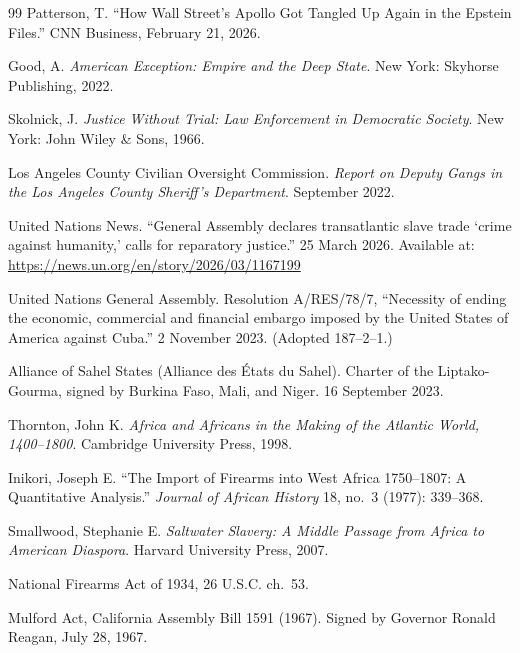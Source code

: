 \documentclass[12pt,openany]{book}
\begin{document}
\begin{thebibliography}{99}
Patterson, T. ``How Wall Street's Apollo Got Tangled Up Again in the Epstein Files.'' CNN Business, February 21, 2026.


Good, A. \textit{American Exception: Empire and the Deep State}. New York: Skyhorse Publishing, 2022.


Skolnick, J. \textit{Justice Without Trial: Law Enforcement in Democratic Society}. New York: John Wiley \& Sons, 1966.

Los Angeles County Civilian Oversight Commission. \textit{Report on Deputy Gangs in the Los Angeles County Sheriff's Department}. September 2022.


United Nations News. ``General Assembly declares transatlantic slave trade `crime against humanity,' calls for reparatory justice.'' 25 March 2026. Available at: \url{https://news.un.org/en/story/2026/03/1167199}

United Nations General Assembly. Resolution A/RES/78/7, ``Necessity of ending the economic, commercial and financial embargo imposed by the United States of America against Cuba.'' 2 November 2023. (Adopted 187--2--1.)

Alliance of Sahel States (Alliance des \'{E}tats du Sahel). Charter of the Liptako-Gourma, signed by Burkina Faso, Mali, and Niger. 16 September 2023.

Thornton, John K. \textit{Africa and Africans in the Making of the Atlantic World, 1400--1800}. Cambridge University Press, 1998.

Inikori, Joseph E. ``The Import of Firearms into West Africa 1750--1807: A Quantitative Analysis.'' \textit{Journal of African History} 18, no.~3 (1977): 339--368.

Smallwood, Stephanie E. \textit{Saltwater Slavery: A Middle Passage from Africa to American Diaspora}. Harvard University Press, 2007.

National Firearms Act of 1934, 26 U.S.C. ch.~53.

Mulford Act, California Assembly Bill 1591 (1967). Signed by Governor Ronald Reagan, July 28, 1967.


\end{thebibliography}
\end{document}

